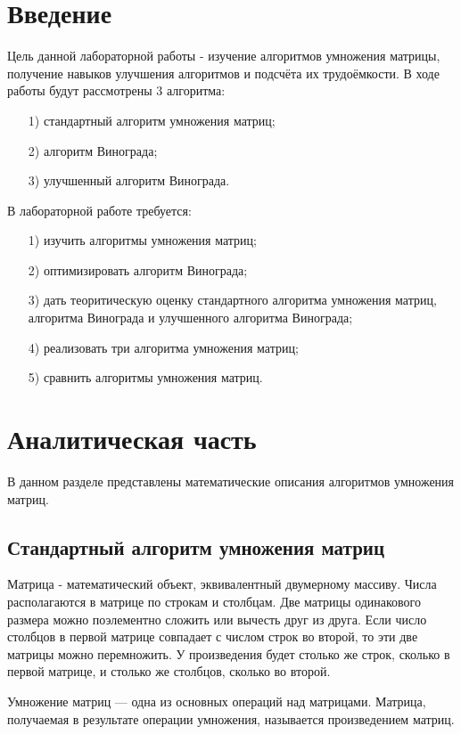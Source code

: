 \documentclass[12pt]{report}
\begin{document}
	\chapter*{Введение}
	Цель данной лабораторной работы - изучение алгоритмов умножения матрицы, получение навыков улучшения алгоритмов и подсчёта их трудоёмкости. В ходе работы будут рассмотрены 3 алгоритма:
	\begin{enumerate}
		\item[1)] стандартный алгоритм умножения матриц;
		\item[2)] алгоритм Винограда;
		\item[3)] улучшенный алгоритм Винограда.
	\end{enumerate}
	В лабораторной работе требуется:
	\begin{enumerate}
		\item[1)] изучить алгоритмы умножения матриц;
		\item[2)] оптимизировать алгоритм Винограда;
		\item[3)] дать теоритическую оценку стандартного алгоритма умножения матриц, алгоритма Винограда и улучшенного алгоритма Винограда;
		\item[4)] реализовать три алгоритма умножения матриц;
		\item[5)] сравнить алгоритмы умножения матриц.		
	\end{enumerate}
	
	
	\newpage
	\chapter{Аналитическая часть}
	В данном разделе представлены математические описания алгоритмов умножения матриц.
	
	\section{Стандартный алгоритм умножения матриц}
	
	Матрица - математический объект, эквивалентный двумерному массиву. Числа располагаются в матрице по строкам и столбцам. Две матрицы одинакового размера можно поэлементно сложить или вычесть друг из друга. Если число столбцов в первой матрице совпадает с числом строк во второй, то эти две матрицы можно перемножить. У произведения будет столько же строк, сколько в первой матрице, и столько же столбцов, сколько во второй.
	
	Умножение матриц — одна из основных операций над матрицами. Матрица, получаемая в результате операции умножения, называется произведением матриц.
	
\end{document}

